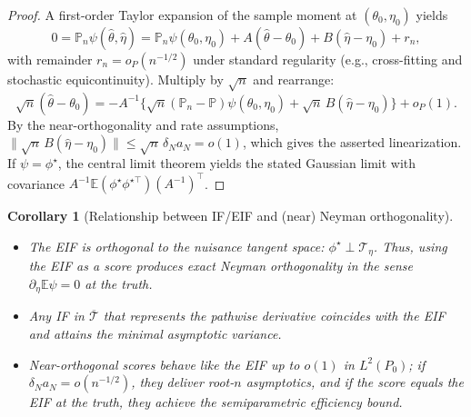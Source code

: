 \documentclass[12pt]{article}
\renewcommand{\(}{\left(}%
\renewcommand{\)}{\right)}%
\renewcommand{\[}{\left[}%
\renewcommand{\]}{\right]}%
\newtheorem{corollary}{Corollary}[section]}
\newtheorem{proof}{Proof.}}
\begin{document}
\begin{proof}
A first-order Taylor expansion of the sample moment at $(\theta_0,\eta_0)$ yields
\begin{equation*}
0=\mathbb P_n\psi(\hat\theta,\hat\eta)
= \mathbb P_n\psi(\theta_0,\eta_0)
+ A(\hat\theta-\theta_0) + B(\hat\eta-\eta_0) + r_n,
\end{equation*}
with remainder $r_n=o_P(n^{-1/2})$ under standard regularity (e.g., cross-fitting and stochastic equicontinuity). Multiply by $\sqrt n$ and rearrange:
\begin{equation*}
\sqrt n(\hat\theta-\theta_0)
= -A^{-1}\Big\{\sqrt n(\mathbb P_n-\mathbb P)\psi(\theta_0,\eta_0)
+ \sqrt n\,B(\hat\eta-\eta_0)\Big\}+o_P(1).
\end{equation*}
By the near-orthogonality and rate assumptions, $\|\sqrt n\,B(\hat\eta-\eta_0)\|\le \sqrt n\,\delta_N a_N=o(1)$, which gives the asserted linearization. If $\psi=\phi^\star$, the central limit theorem yields the stated Gaussian limit with covariance $A^{-1}\mathbb E(\phi^\star\phi^{\star\top})(A^{-1})^\top$.
\end{proof}

\begin{corollary}[Relationship between IF/EIF and (near) Neyman orthogonality]

\
\begin{itemize}
\item The EIF is orthogonal to the nuisance tangent space: $\phi^\star\perp\mathcal T_\eta$. Thus, using the EIF as a score produces exact Neyman orthogonality in the sense $\partial_\eta \mathbb E\psi=0$ at the truth.
\item Any IF in $\overline{\mathcal T}$ that represents the pathwise derivative coincides with the EIF and attains the minimal asymptotic variance.
\item Near-orthogonal scores behave like the EIF up to $o(1)$ in $L^2(P_0)$; if $\delta_N a_N=o(n^{-1/2})$, they deliver root-$n$ asymptotics, and if the score equals the EIF at the truth, they achieve the semiparametric efficiency bound.
\end{itemize}
\end{corollary}
\end{document}
